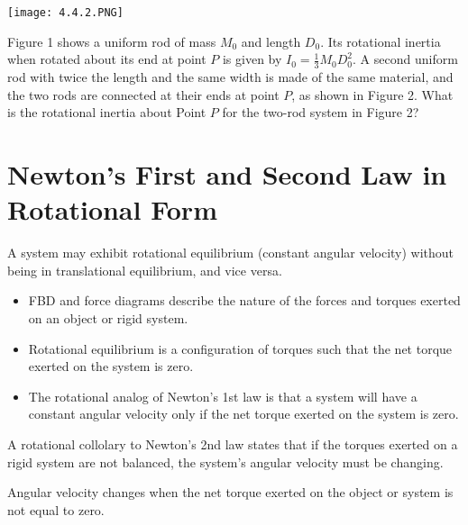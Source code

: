 \documentclass[../mech.tex]{subfiles}
\begin{document}
\ex \begin{center}
    \texttt{[image: 4.4.2.PNG]}
\end{center}
Figure 1 shows a uniform rod of mass $M_0$ and length $D_0$. Its rotational inertia when rotated about its end at point $P$ is given by $I_0=\frac{1}{3}M_0D_0^2$. A second uniform rod with twice the length 
and the same width is made of the same material, and the two rods are connected at their ends at point $P$, as shown in Figure 2. What is the rotational inertia about Point $P$ for the two-rod system in Figure 2?

\section{Newton's First and Second Law in Rotational Form}
A system may exhibit rotational equilibrium (constant angular velocity) without being in translational equilibrium, and vice versa.
\begin{itemize}
    \item FBD and force diagrams describe the nature of the forces and torques exerted on an object or rigid system.
    \item Rotational equilibrium is a configuration of torques such that the net torque exerted on the system is zero.
    \item The rotational analog of Newton's 1st law is that a system will have a constant angular velocity only if the net torque exerted on the system is zero.
\end{itemize}

A rotational collolary to Newton's 2nd law states that if the torques exerted on a rigid system are not balanced, the system's angular velocity must be changing.

Angular velocity changes when the net torque exerted on the object or system is not equal to zero.
\end{document}
